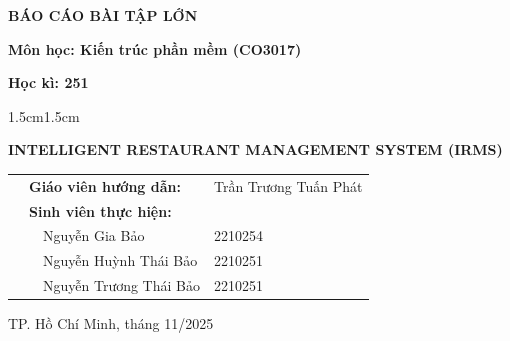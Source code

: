 \documentclass[12pt, a4paper]{report}
\theoremstyle{definition}
\begin{document}
\begin{titlepage}
\begin{center}
            \large
            
            \textbf{BÁO CÁO BÀI TẬP LỚN}
            
            \textbf{Môn học: Kiến trúc phần mềm (CO3017)} 
            
            \textbf{Học kì: 251}

            \vspace{0.5cm}
            
            \begin{changemargin}{1.5cm}{1.5cm}
                \begin{center}
                    
                    \Large
                    \textbf{INTELLIGENT RESTAURANT MANAGEMENT SYSTEM (IRMS)}
                \end{center}
            \end{changemargin}
            
            \vspace{0.5cm}

		  \normalsize
            
            {
            \begin{center}
            \renewcommand{\arraystretch}{1.25}
            \begin{tabular}{ p{0.5cm} p{0.5cm} p{6cm} p{5cm} }
				& \multicolumn{2}{l}{\textbf{Giáo viên hướng dẫn:}} & Trần Trương Tuấn Phát \\
    
				& \multicolumn{3}{l}{\textbf{Sinh viên thực hiện:}} \\
				\vspace{0.5cm}
				& &Nguyễn Gia Bảo		&2210254 \\
				& &Nguyễn Huỳnh Thái Bảo		&2210251 \\
				& &Nguyễn Trương Thái Bảo		&2210251 \\

		\end{tabular}
            \end{center}
            }

                \vspace{2cm}

                \footnotesize
                TP. Hồ Chí Minh, tháng 11/2025

                \vspace{5mm}
        \end{center}
    \end{titlepage}
\end{document}

